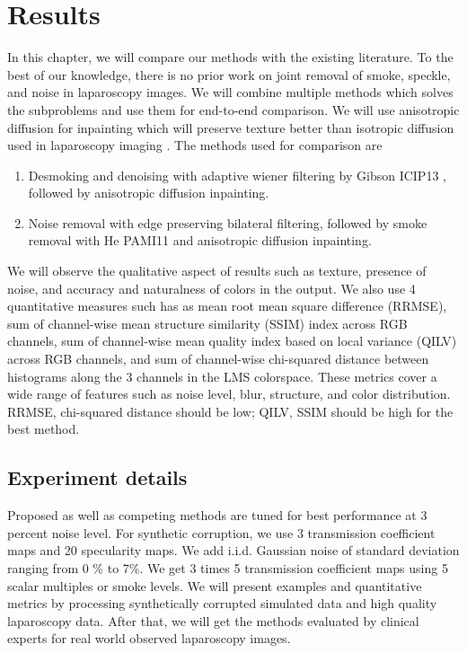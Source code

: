 \chapter{Results}

In this chapter, we will compare our methods with the existing literature. To the best of our knowledge, there is no prior work on joint removal of smoke, speckle, and noise in laparoscopy images. We will combine multiple methods which solves the subproblems and use them for end-to-end comparison. We will use anisotropic diffusion for inpainting which will preserve texture better than isotropic diffusion used in laparoscopy imaging \cite{saint2011detection, arnold2010speckle}. The methods used for comparison are
\begin{enumerate}
    \item Desmoking and denoising with adaptive wiener filtering by Gibson ICIP13 \cite{gibson2013wiener}, followed by anisotropic diffusion inpainting.
    \item Noise removal with edge preserving bilateral filtering, followed by smoke removal with He PAMI11 \cite{he2011dark} and anisotropic diffusion inpainting.
\end{enumerate}

We will observe the qualitative aspect of results such as texture, presence of noise, and accuracy and naturalness of colors in the output. We also use 4 quantitative measures such has as mean root mean square difference (RRMSE), sum of channel-wise mean structure similarity (SSIM) index across RGB channels, sum of channel-wise mean quality index based on local variance (QILV) across RGB channels, and sum of channel-wise chi-squared distance between histograms along the 3 channels in the LMS colorspace. These metrics cover a wide range of features such as noise level, blur, structure, and color distribution. RRMSE, chi-squared distance should be low; QILV, SSIM should be high for the best method.

\section{Experiment details}
Proposed as well as competing methods are tuned for best performance at 3 percent noise level. For synthetic corruption, we use 3 transmission coefficient maps and 20 specularity maps. We add i.i.d. Gaussian noise of standard deviation ranging from 0 \% to 7\%. We get 3 times 5 transmission coefficient maps using 5 scalar multiples or smoke levels. We will present examples and quantitative metrics by processing synthetically corrupted simulated data and high quality laparoscopy data. After that, we will get the methods evaluated by clinical experts for real world observed laparoscopy images.

